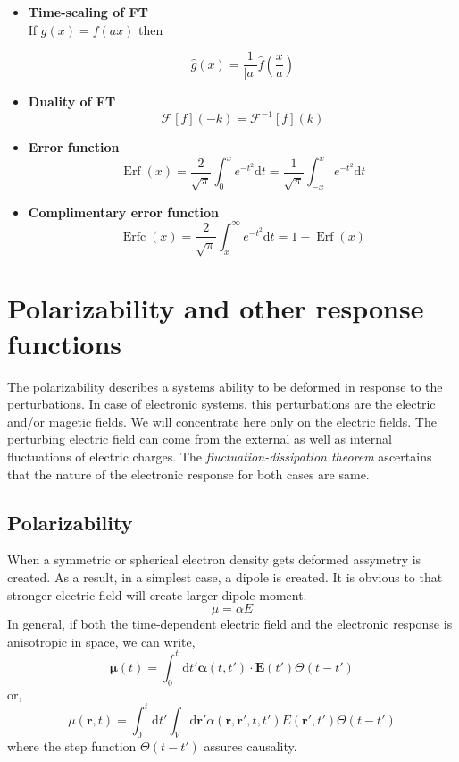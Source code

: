 \documentclass{article}
\newcommand{\dotproduct}[2]
{
#1 \cdot #2
}
\newcommand{\eq}{\begin{equation}}
\newcommand{\qe}{\end{equation}}
\DeclareMathOperator{\erf}{Erf}
\DeclareMathOperator{\erfc}{Erfc}
\newcommand{\diff}{\mathrm{d}}
\newcommand{\rr}{\mathbf{r}}
\newcommand{\abs}[1]{\vert #1\vert}
\begin{document}
\begin{itemize}
\item{\bf Time-scaling of FT}\\

If $g(x) = f(a x)$ then 

 \begin{equation*}
\hat{g}(x) = \frac{1}{\abs{a}}\hat{f}(\frac{x}{a})
\end{equation*}

\item{\bf Duality of FT}\\

\begin{equation*}
\mathcal{F}[f](-k) =\mathcal{F}^{-1}[f](k)
\end{equation*}
\item{\bf Error function}\\
  \begin{equation*}
\erf(x) = \frac{2}{\sqrt{\pi}}\int_{0}^{x}  e^{-t^{2}} \diff t =  \frac{1}{\sqrt{\pi}}\int_{-x}^{x}  e^{-t^{2}} \diff t 
\end{equation*}
\item{\bf Complimentary error function}\\
  \begin{equation*}
\erfc(x) = \frac{2}{\sqrt{\pi}}\int_{x}^{\infty}  e^{-t^{2}} \diff t = 1-\erf(x)
\end{equation*}

 

\end{itemize}

\section{Polarizability and other response functions}
The polarizability describes a systems ability to be deformed in response to the perturbations. In case of electronic systems, this perturbations are the electric and/or magetic fields. We will concentrate here only on the electric fields. The perturbing electric field can come from the external as well as internal fluctuations of electric charges. The \emph{fluctuation-dissipation theorem}\cite{langreth1977} ascertains that the nature of the electronic response for both cases are same.  
\subsection{Polarizability}
When a symmetric or spherical electron density gets deformed assymetry is created. As a result, in a simplest case, a dipole is created. It is obvious to that stronger electric field will create larger dipole moment. 
\begin{equation}
 \mu = \alpha E
\end{equation} 
  In general, if both the time-dependent electric field and the electronic response is anisotropic in space, we can write,
\eq
\boldsymbol{\mu} (t)= \int_{0}^{t} \diff t' \dotproduct{\boldsymbol{\alpha}(t,t')}{\mathbf{E}(t')}\Theta(t-t')
\qe
 or,
\eq
\mu(\rr, t) =  \int_{0}^{t} \diff t' \int_{V} \diff \rr' \alpha(\rr,\rr',t, t' )E(\rr', t')\Theta(t-t')
\qe
where the step function $\Theta(t-t')$ assures causality.\\
\end{document}
